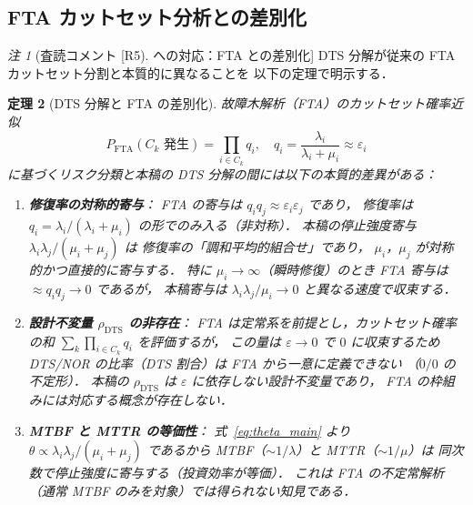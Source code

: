 \documentclass[12pt,a4paper]{article}
\theoremstyle{plain}
\newtheorem{theorem}{定理}[section]
\theoremstyle{definition}
\theoremstyle{remark}
\newtheorem{remark}[theorem]{注}
\newcommand{\eps}{\varepsilon}
\newcommand{\rhoDTS}{\rho_{\mathrm{DTS}}}
\begin{document}
\subsection{FTA カットセット分析との差別化}

\begin{remark}[査読コメント [R5] への対応：FTA との差別化]
  DTS 分解が従来の FTA カットセット分割と本質的に異なることを
  以下の定理で明示する．
\end{remark}

\begin{theorem}[DTS 分解と FTA の差別化]\label{thm:DTS_vs_FTA}
  故障木解析（FTA）のカットセット確率近似
  \begin{equation}\label{eq:FTA}
    P_{\mathrm{FTA}}(C_k\text{ 発生}) = \prod_{i\in C_k}q_i,
    \quad q_i = \frac{\lambda_i}{\lambda_i+\mu_i} \approx \eps_i
  \end{equation}
  に基づくリスク分類と本稿の DTS 分解の間には以下の本質的差異がある：
  \begin{enumerate}[label=(\roman*)]
    \item \textbf{修復率の対称的寄与}：
      FTA の寄与は $q_iq_j\approx\eps_i\eps_j$ であり，
      修復率は $q_i=\lambda_i/(\lambda_i+\mu_i)$ の形でのみ入る（非対称）．
      本稿の停止強度寄与 $\lambda_i\lambda_j/(\mu_i+\mu_j)$ は
      修復率の「調和平均的組合せ」であり，
      $\mu_i$，$\mu_j$ が対称的かつ直接的に寄与する．
      特に $\mu_i\to\infty$（瞬時修復）のとき
      FTA 寄与は $\approx q_iq_j\to0$ であるが，
      本稿寄与は $\lambda_i\lambda_j/\mu_i\to0$ と異なる速度で収束する．

    \item \textbf{設計不変量 $\rhoDTS$ の非存在}：
      FTA は定常系を前提とし，カットセット確率の和
      $\sum_k\prod_{i\in C_k}q_i$ を評価するが，
      この量は $\eps\to0$ で $0$ に収束するため
      DTS/NOR の比率（DTS 割合）は FTA から一意に定義できない
      （$0/0$ の不定形）．
      本稿の $\rhoDTS$ は $\eps$ に依存しない設計不変量であり，
      FTA の枠組みには対応する概念が存在しない．

    \item \textbf{MTBF と MTTR の等価性}：
      式~\eqref{eq:theta_main} より
      $\theta \propto \lambda_i\lambda_j/(\mu_i+\mu_j)$
      であるから MTBF（$\sim 1/\lambda$）と MTTR（$\sim 1/\mu$）は
      同次数で停止強度に寄与する（投資効率が等価）．
      これは FTA の不定常解析（通常 MTBF のみを対象）では得られない知見である．
  \end{enumerate}
\end{theorem}
\end{document}
